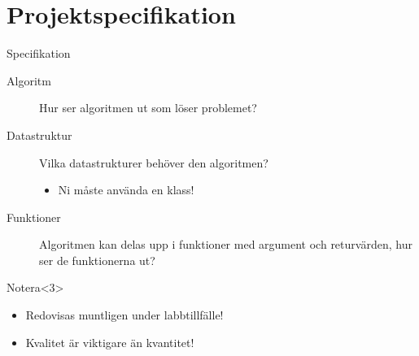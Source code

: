 \section{Projektspecifikation}

\begin{frame}
  \begin{block}{Specifikation}
    \begin{description}
      \item[Algoritm] Hur ser algoritmen ut som löser problemet?
      \item[Datastruktur] Vilka datastrukturer behöver den algoritmen?
        \begin{itemize}
          \item \alert<2>{Ni måste använda en klass!}
        \end{itemize}
      \item[Funktioner] Algoritmen kan delas upp i funktioner med argument och 
        returvärden, hur ser de funktionerna ut?
    \end{description}
  \end{block}

  \begin{alertblock}{Notera}<3>
    \begin{itemize}
      \item Redovisas muntligen under labbtillfälle!
      \item Kvalitet är viktigare än kvantitet!
    \end{itemize}
  \end{alertblock}
\end{frame}

